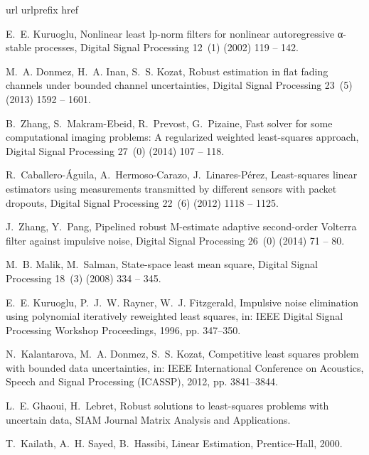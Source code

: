 \documentclass[review,sort&compress]{elsarticle}
\begin{document}

\begin{thebibliography}{10}
\expandafter\ifx\csname url\endcsname\relax
  \def\url#1{\texttt{#1}}\fi
\expandafter\ifx\csname urlprefix\endcsname\relax\def\urlprefix{URL }\fi
\expandafter\ifx\csname href\endcsname\relax
  \def\href#1#2{#2} \def\path#1{#1}\fi

E.~E. Kuruoglu, Nonlinear least lp-norm filters for nonlinear autoregressive
  α-stable processes, Digital Signal Processing 12~(1) (2002) 119 -- 142.

M.~A. Donmez, H.~A. Inan, S.~S. Kozat, Robust estimation in flat fading
  channels under bounded channel uncertainties, Digital Signal Processing
  23~(5) (2013) 1592 -- 1601.

B.~Zhang, S.~Makram-Ebeid, R.~Prevost, G.~Pizaine, Fast solver for some
  computational imaging problems: A regularized weighted least-squares
  approach, Digital Signal Processing 27~(0) (2014) 107 -- 118.

R.~Caballero-Águila, A.~Hermoso-Carazo, J.~Linares-Pérez, Least-squares
  linear estimators using measurements transmitted by different sensors with
  packet dropouts, Digital Signal Processing 22~(6) (2012) 1118 -- 1125.

J.~Zhang, Y.~Pang, Pipelined robust {M}-estimate adaptive second-order
  {V}olterra filter against impulsive noise, Digital Signal Processing 26~(0)
  (2014) 71 -- 80.

M.~B. Malik, M.~Salman, State-space least mean square, Digital Signal
  Processing 18~(3) (2008) 334 -- 345.

E.~E. Kuruoglu, P.~J.~W. Rayner, W.~J. Fitzgerald, Impulsive noise elimination
  using polynomial iteratively reweighted least squares, in: IEEE Digital
  Signal Processing Workshop Proceedings, 1996, pp. 347--350.

N.~Kalantarova, M.~A. Donmez, S.~S. Kozat, Competitive least squares problem
  with bounded data uncertainties, in: IEEE International Conference on
  Acoustics, Speech and Signal Processing (ICASSP), 2012, pp. 3841--3844.

L.~E. Ghaoui, H.~Lebret, Robust solutions to least-squares problems with
  uncertain data, SIAM Journal Matrix Analysis and Applications.

T.~Kailath, A.~H. Sayed, B.~Hassibi, Linear Estimation, Prentice-Hall, 2000.


\end{thebibliography}
\end{document}
